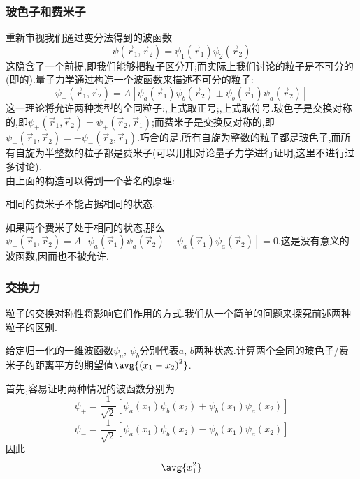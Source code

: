 \documentclass{ctexart}
\begin{document}
\subsubsection{玻色子和费米子}
重新审视我们通过变分法得到的波函数
\[\psi\left(\vec{r}_1,\vec{r}_2\right)=\psi_1\left(\vec{r}_1\right)\psi_2\left(\vec{r}_2\right)\]
这隐含了一个前提,即我们能够把粒子区分开;而实际上我们讨论的粒子是不可分的(即的).量子力学通过构造一个波函数来描述不可分的粒子:
\[\psi_{\pm}\left(\vec{r}_1,\vec{r}_2\right)=A\left[\psi_a\left(\vec{r}_1\right)\psi_b\left(\vec{r}_2\right)\pm\psi_b\left(\vec{r}_1\right)\psi_a\left(\vec{r}_2\right)\right]\]
这一理论将允许两种类型的全同粒子:,上式取正号;,上式取符号.玻色子是交换对称的,即$\psi_+\left(\vec{r}_1,\vec{r}_2\right)=\psi_+\left(\vec{r}_2,\vec{r}_1\right)$;而费米子是交换反对称的,即$\psi_-\left(\vec{r}_1,\vec{r}_2\right)=-\psi_-\left(\vec{r}_2,\vec{r}_1\right)$.巧合的是,所有自旋为整数的粒子都是玻色子,而所有自旋为半整数的粒子都是费米子(可以用相对论量子力学进行证明,这里不进行过多讨论).\\
\indent 由上面的构造可以得到一个著名的原理:
\begin{theorem}[泡利不相容原理]
    相同的费米子不能占据相同的状态.
\end{theorem}
\noindent 如果两个费米子处于相同的状态,那么$\psi_-\left(\vec{r}_1,\vec{r}_2\right)=A\left[\psi_a\left(\vec{r}_1\right)\psi_a\left(\vec{r}_2\right)-\psi_a\left(\vec{r}_1\right)\psi_a\left(\vec{r}_2\right)\right]=0$,这是没有意义的波函数,因而也不被允许.
\subsubsection{交换力}
粒子的交换对称性将影响它们作用的方式.我们从一个简单的问题来探究前述两种粒子的区别.
\begin{problem}
    给定归一化的一维波函数$\psi_a$, $\psi_b$分别代表$a$, $b$两种状态.计算两个全同的玻色子/费米子的距离平方的期望值$\avg{\left(x_1-x_2\right)^2}$.
\end{problem}
\begin{solution}
首先,容易证明两种情况的波函数分别为
\[\psi_+=\dfrac{1}{\sqrt{2}}\left[\psi_a\left(x_1\right)\psi_b\left(x_2\right)+\psi_b\left(x_1\right)\psi_a\left(x_2\right)\right]\]
\[\psi_-=\dfrac{1}{\sqrt{2}}\left[\psi_a\left(x_1\right)\psi_b\left(x_2\right)-\psi_b\left(x_1\right)\psi_a\left(x_2\right)\right]\]
因此
\[\begin{aligned}
    \avg{x_1^2}
\end{aligned}\]
\end{solution}
\end{document}
